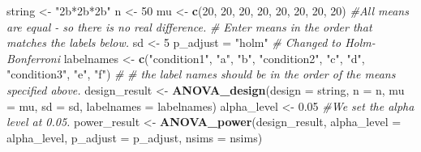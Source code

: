 \documentclass[]{book}
\newenvironment{Shaded}{\begin{snugshade}}{\end{snugshade}}
\newcommand{\CommentTok}[1]{\textcolor[rgb]{0.56,0.35,0.01}{\textit{#1}}}
\newcommand{\DataTypeTok}[1]{\textcolor[rgb]{0.13,0.29,0.53}{#1}}
\newcommand{\DecValTok}[1]{\textcolor[rgb]{0.00,0.00,0.81}{#1}}
\newcommand{\FloatTok}[1]{\textcolor[rgb]{0.00,0.00,0.81}{#1}}
\newcommand{\KeywordTok}[1]{\textcolor[rgb]{0.13,0.29,0.53}{\textbf{#1}}}
\newcommand{\NormalTok}[1]{#1}
\newcommand{\StringTok}[1]{\textcolor[rgb]{0.31,0.60,0.02}{#1}}
\begin{document}
\begin{Shaded}
\begin{Highlighting}[]
\NormalTok{string <-}\StringTok{ "2b*2b*2b"}
\NormalTok{n <-}\StringTok{ }\DecValTok{50}
\NormalTok{mu <-}\StringTok{ }\KeywordTok{c}\NormalTok{(}\DecValTok{20}\NormalTok{, }\DecValTok{20}\NormalTok{, }\DecValTok{20}\NormalTok{, }\DecValTok{20}\NormalTok{, }\DecValTok{20}\NormalTok{, }\DecValTok{20}\NormalTok{, }\DecValTok{20}\NormalTok{, }\DecValTok{20}\NormalTok{) }\CommentTok{#All means are equal - so there is no real difference.}
\CommentTok{# Enter means in the order that matches the labels below.}
\NormalTok{sd <-}\StringTok{ }\DecValTok{5}
\NormalTok{p_adjust =}\StringTok{ "holm"}
\CommentTok{# Changed to Holm-Bonferroni}
\NormalTok{labelnames <-}\StringTok{ }\KeywordTok{c}\NormalTok{(}\StringTok{"condition1"}\NormalTok{, }\StringTok{"a"}\NormalTok{, }\StringTok{"b"}\NormalTok{, }\StringTok{"condition2"}\NormalTok{, }\StringTok{"c"}\NormalTok{, }\StringTok{"d"}\NormalTok{, }\StringTok{"condition3"}\NormalTok{, }\StringTok{"e"}\NormalTok{, }\StringTok{"f"}\NormalTok{) }\CommentTok{#}
\CommentTok{# the label names should be in the order of the means specified above.}
\NormalTok{design_result <-}\StringTok{ }\KeywordTok{ANOVA_design}\NormalTok{(}\DataTypeTok{design =}\NormalTok{ string,}
                   \DataTypeTok{n =}\NormalTok{ n, }
                   \DataTypeTok{mu =}\NormalTok{ mu, }
                   \DataTypeTok{sd =}\NormalTok{ sd, }
                   \DataTypeTok{labelnames =}\NormalTok{ labelnames)}
\NormalTok{alpha_level <-}\StringTok{ }\FloatTok{0.05}
\CommentTok{#We set the alpha level at 0.05. }
\NormalTok{power_result <-}\StringTok{ }\KeywordTok{ANOVA_power}\NormalTok{(design_result, }
                            \DataTypeTok{alpha_level =}\NormalTok{ alpha_level,}
                            \DataTypeTok{p_adjust =}\NormalTok{ p_adjust,}
                            \DataTypeTok{nsims =}\NormalTok{ nsims)}
\end{Highlighting}
\end{Shaded}
\end{document}
